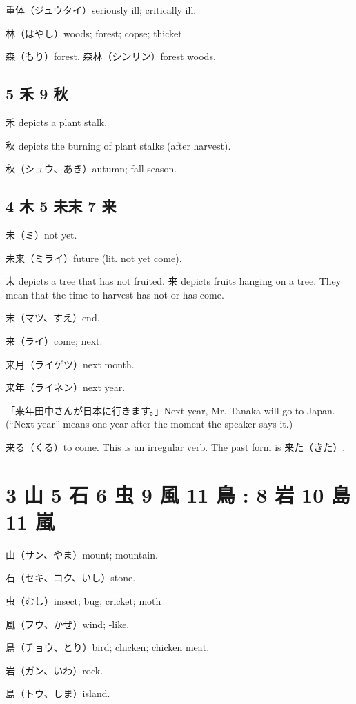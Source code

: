 重体（ジュウタイ）seriously ill; critically ill.

林（はやし）woods; forest; copse; thicket

森（もり）forest.
森林（シンリン）forest woods.

\subsection{5 禾 9 秋}

禾 depicts a plant stalk.

秋 depicts the burning of plant stalks (after harvest).

秋（シュウ、あき）autumn; fall season.

\subsection{4 木 5 未末 7 来}

未（ミ）not yet.

未来（ミライ）future (lit. not yet come).

未 depicts a tree that has not fruited.
来 depicts fruits hanging on a tree.
They mean that the time to harvest has not or has come.

末（マツ、すえ）end.

来（ライ）come; next.

来月（ライゲツ）next month.

来年（ライネン）next year.

「来年田中さんが日本に行きます。」Next year, Mr. Tanaka will go to Japan.
(``Next year'' means one year after the moment the speaker says it.)

来る（くる）to come.
This is an irregular verb.
The past form is 来た（きた）.

\section{3 山 5 石 6 虫 9 風 11 鳥 : 8 岩 10 島 11 嵐}

山（サン、やま）mount; mountain.

石（セキ、コク、いし）stone.

虫（むし）insect; bug; cricket; moth

風（フウ、かぜ）wind; -like.

鳥（チョウ、とり）bird; chicken; chicken meat.

岩（ガン、いわ）rock.

島（トウ、しま）island.


